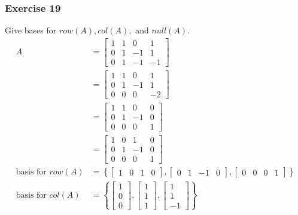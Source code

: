 \documentclass{math}
\begin{document}
\subsubsection*{Exercise 19}
Give bases for \( row(A), col(A), \text{ and } null(A) \).
\begin{align*}
  A &= \begin{bmatrix}
    1 & 1 & 0 & 1 \\
    0 & 1 & -1 & 1 \\
    0 & 1 & -1 & -1
  \end{bmatrix} \\
  &= \begin{bmatrix}
    1 & 1 & 0 & 1 \\
    0 & 1 & -1 & 1 \\
    0 & 0 & 0 & -2
  \end{bmatrix} \\
  &= \begin{bmatrix}
    1 & 1 & 0 & 0 \\
    0 & 1 & -1 & 0 \\
    0 & 0 & 0 & 1
  \end{bmatrix} \\
  &= \begin{bmatrix}
    1 & 0 & 1 & 0 \\
    0 & 1 & -1 & 0 \\
    0 & 0 & 0 & 1
  \end{bmatrix} \\
  \text{basis for } row(A) &= \left\{\begin{bmatrix}
    1 & 0 & 1 & 0
  \end{bmatrix},\begin{bmatrix}
    0 & 1 & -1 & 0
  \end{bmatrix},\begin{bmatrix}
    0 & 0 & 0 & 1
  \end{bmatrix}\right\} \\
  \text{basis for } col(A) &= \left\{\begin{bmatrix}
    1 \\ 0 \\ 0
  \end{bmatrix},\begin{bmatrix}
    1 \\ 1 \\ 1
  \end{bmatrix},\begin{bmatrix}
    1 \\ 1 \\ -1
  \end{bmatrix}\right\} \\

\end{align*}
\end{document}
